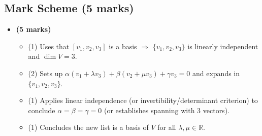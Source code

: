 \documentclass[12pt]{article}
\begin{document}
\subsection{Mark Scheme (5 marks)}
\begin{itemize}[leftmargin=1.6em]
  \item \textbf{(5 marks)}
  \begin{itemize}[leftmargin=1.6em]
    \item (1) Uses that $[v_1,v_2,v_3]$ is a basis $\Rightarrow$ $\{v_1,v_2,v_3\}$ is linearly independent and $\dim V=3$.
    \item (2) Sets up $\alpha (v_1+\lambda v_3)+\beta (v_2+\mu v_3)+\gamma v_3=0$ and expands in $\{v_1,v_2,v_3\}$.
    \item (1) Applies linear independence (or invertibility/determinant criterion) to conclude $\alpha=\beta=\gamma=0$ (or establishes spanning with 3 vectors).
    \item (1) Concludes the new list is a basis of $V$ for all $\lambda,\mu\in\mathbb{R}$.
  \end{itemize}
\end{itemize}
\end{document}
